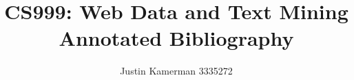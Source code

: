 \documentclass[10pt]{unbthesis}
\title{CS999: Web Data and Text Mining\\ Annotated Bibliography}
\author{Justin Kamerman 3335272}
\begin{document}
\maketitle
\nocite{*}



\end{document}
